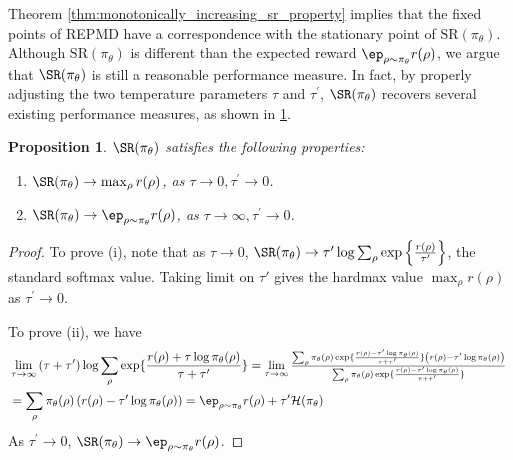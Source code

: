 \documentclass{article}
\newtheorem{prop}{Proposition}
\begin{document}
Theorem \ref{thm:monotonically_increasing_sr_property} implies that the fixed points of REPMD have a correspondence with the stationary point of $\text{SR}(\pi_\theta)$. 
Although $\text{SR}(\pi_\theta)$ is different than the expected reward $\ep_{\rho \sim \pi_\theta}{r(\rho)}$,  we argue that $\SR(\pi_\theta)$ is still a reasonable performance measure. In fact, by properly adjusting the two temperature parameters $\tau$ and $\tau^{\prime}$, $\SR(\pi_\theta)$ recovers several existing performance measures, as shown in \cref{prop:sr}.
\begin{prop}
	\label{prop:sr}
	$\SR(\pi_\theta)$ satisfies the following properties:
	\begin{enumerate}[label=(\roman*)]
		\item  $\SR(\pi_\theta) \to \max_{\rho}{r(\rho)}$, as $\tau \to 0, \tau^{\prime} \to 0$.
		\item $\SR(\pi_\theta) \to \ep_{\rho \sim \pi_\theta}{r(\rho)}$, as $\tau \to \infty, \tau^{\prime} \to 0$. 
	\end{enumerate}	
\end{prop}
\begin{proof}
	To prove (i), note that as $\tau \to 0$, $\SR(\pi_\theta) \to \tau^{\prime} \log{ \sum_{\rho}{ \exp\left\{ \frac{r(\rho) }{ \tau^{\prime} } \right\} }}$, the standard softmax value. Taking limit on $\tau'$ gives the hardmax value $\max_{\rho}{r(\rho)}$ as $\tau^{\prime} \to 0$.
	
	To prove (ii), we have 
\begin{align*}
&\lim\limits_{\tau \to \infty}{ (\tau + \tau^{\prime})\log{ \sum_{\rho}{ \exp\{ \frac{r(\rho) + \tau \log{\pi_\theta(\rho)} }{\tau + \tau^{\prime}} \} }} } = {\scalebox{.95} {$\lim\limits_{\tau \to \infty}{ \frac{ \sum_{\rho}{ \pi_\theta(\rho) \exp\{ \frac{r(\rho) - \tau^{\prime} \log{\pi_\theta(\rho)} }{\tau + \tau^{\prime}} \} \left( r(\rho) - \tau^{\prime}\log{\pi_\theta(\rho)} \right) } }{  \sum_{\rho}{ \pi_\theta(\rho) \exp\{ \frac{r(\rho) - \tau^{\prime} \log{\pi_\theta(\rho)} }{\tau + \tau^{\prime}} \} } } }$ } }\\
&= \sum_{\rho}{ \pi_\theta(\rho) \left( r(\rho) - \tau^{\prime}\log{\pi_\theta(\rho)} \right) } = \ep_{\rho \sim \pi_\theta}{r(\rho)} + \tau^{\prime} \mathcal{H}(\pi_\theta)
 \end{align*}
 	As $\tau^{\prime} \to 0$, $\SR(\pi_\theta) \to \ep_{\rho \sim \pi_\theta}{r(\rho)}$.
\end{proof}
\end{document}
